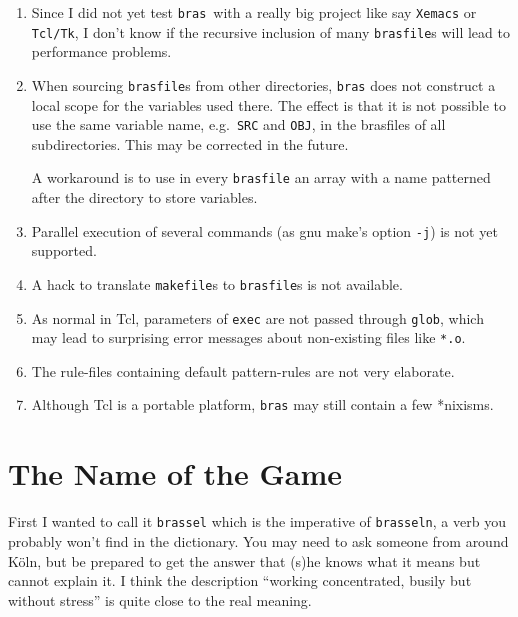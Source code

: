 \documentclass[11pt]{scrartcl}
\newcommand{\bras}{\texttt{bras}}
\begin{document}
\begin{enumerate}
\item Since I did not yet test \bras\ with a really big project like
  say \texttt{Xemacs} or \texttt{Tcl/Tk}, I don't know if the
  recursive inclusion of many \texttt{brasfile}s will lead to
  performance problems.

\item When sourcing \texttt{brasfile}s from other directories, \bras{}
  does not construct a local scope for the variables used there. The
  effect is that it is not possible to use the same variable name,
  e.g.\ \texttt{SRC} and \texttt{OBJ}, in the brasfiles of all
  subdirectories. This may be corrected in the future.
  
  A workaround is to use in every \texttt{brasfile} an array with a
  name patterned after the directory to store variables.
  
\item Parallel execution of several commands (as gnu make's option
  \texttt{-j}) is not yet supported.
  
\item A hack to translate \texttt{makefile}s to \texttt{brasfile}s is
  not available.
  
\item As normal in Tcl, parameters of \texttt{exec} are not passed
  through \texttt{glob}, which may lead to surprising error messages
  about non-existing files like \texttt{*.o}.
  
\item The rule-files containing default pattern-rules are not very
  elaborate.
  
\item Although Tcl is a portable platform, \bras{} may still contain a
  few *nixisms.
\end{enumerate}

\section{The Name of the Game}

First I wanted to call it \texttt{brassel} which is the imperative of
\texttt{brasseln}, a verb you probably won't find in the
dictionary. You may need to ask someone from around K\"oln, but be
prepared to get the answer that (s)he knows what it means but cannot
explain it. I think the description "`working concentrated, busily but
without stress"' is quite close to the real meaning.
\end{document}
